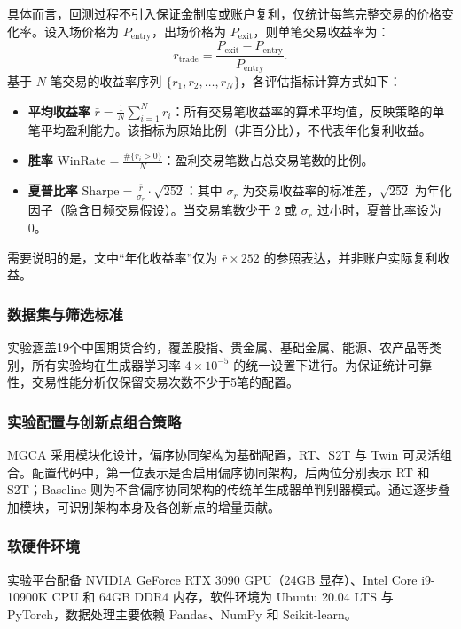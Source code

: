 具体而言，回测过程不引入保证金制度或账户复利，仅统计每笔完整交易的价格变化率。设入场价格为 $P_{\text{entry}}$，出场价格为 $P_{\text{exit}}$，则单笔交易收益率为：
\begin{equation}
r_{\text{trade}} = \frac{P_{\text{exit}} - P_{\text{entry}}}{P_{\text{entry}}}.
\end{equation}
基于 $N$ 笔交易的收益率序列 $\{r_1, r_2, \dots, r_N\}$，各评估指标计算方式如下：
\begin{itemize}
    \item \textbf{平均收益率} $\bar r = \frac{1}{N}\sum_{i=1}^{N} r_i$：所有交易笔收益率的算术平均值，反映策略的单笔平均盈利能力。该指标为原始比例（非百分比），不代表年化复利收益。
    \item \textbf{胜率} $\text{WinRate} = \frac{\#\{r_i > 0\}}{N}$：盈利交易笔数占总交易笔数的比例。
    \item \textbf{夏普比率} $\text{Sharpe} = \frac{\bar r}{\sigma_r} \cdot \sqrt{252}$：其中 $\sigma_r$ 为交易收益率的标准差，$\sqrt{252}$ 为年化因子（隐含日频交易假设）。当交易笔数少于 2 或 $\sigma_r$ 过小时，夏普比率设为 0。
\end{itemize}
需要说明的是，文中“年化收益率”仅为 $\bar r \times 252$ 的参照表达，并非账户实际复利收益。

\subsubsection{数据集与筛选标准}
实验涵盖19个中国期货合约，覆盖股指、贵金属、基础金属、能源、农产品等类别，所有实验均在生成器学习率 $4\times10^{-5}$ 的统一设置下进行。为保证统计可靠性，交易性能分析仅保留交易次数不少于5笔的配置。

\subsubsection{实验配置与创新点组合策略}
MGCA 采用模块化设计，偏序协同架构为基础配置，RT、S2T 与 Twin 可灵活组合。配置代码中，第一位表示是否启用偏序协同架构，后两位分别表示 RT 和 S2T；Baseline 则为不含偏序协同架构的传统单生成器单判别器模式。通过逐步叠加模块，可识别架构本身及各创新点的增量贡献。

\subsubsection{软硬件环境}
实验平台配备 NVIDIA GeForce RTX 3090 GPU（24GB 显存）、Intel Core i9-10900K CPU 和 64GB DDR4 内存，软件环境为 Ubuntu 20.04 LTS 与 PyTorch，数据处理主要依赖 Pandas、NumPy 和 Scikit-learn。

